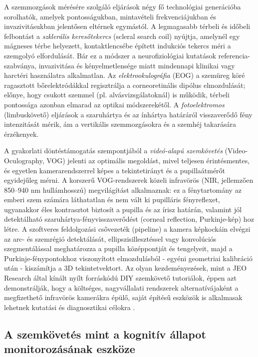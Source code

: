 \documentclass[12pt,a4paper,oneside]{book}
\begin{document}
A szemmozgások mérésére szolgáló eljárások négy fő technológiai generációba sorolhatók, amelyek pontosságukban, mintavételi frekvenciájukban és invazivitásukban jelentősen eltérnek egymástól. A legmagasabb térbeli és időbeli felbontást a \emph{szklerális keresőtekercs} (scleral search coil) nyújtja, amelynél egy mágneses térbe helyezett, kontaktlencsébe épített indukciós tekercs méri a szemgolyó elfordulását. Bár ez a módszer a neurofiziológiai kutatások referencia-szabványa, invazivitása és kényelmetlensége miatt mindennapi klinikai vagy harctéri használatra alkalmatlan. Az \emph{elektrookulográfia} (EOG) a szemüreg köré ragasztott bőrelektródákkal regisztrálja a corneoretinális dipólus elmozdulását; előnye, hogy csukott szemmel (pl. alvásvizsgálatoknál) is működik, térbeli pontossága azonban elmarad az optikai módszerekétől. A \emph{fotoelektromos} (limbuskövető) eljárások a szaruhártya és az ínhártya határáról visszaverődő fény intenzitását mérik, ám a vertikális szemmozgásokra és a szemhéj takarására érzékenyek.

A gyakorlati döntéstámogatás szempontjából a \emph{videó-alapú szemkövetés} (Video-Oculography, VOG) jelenti az optimális megoldást, mivel teljesen érintésmentes, és egyetlen kamerarendszerrel képes a tekintetirányt és a pupillaátmérőt egyidejűleg mérni. A korszerű VOG-rendszerek közeli infravörös (NIR, jellemzően 850--940 nm hullámhosszú) megvilágítást alkalmaznak: ez a fénytartomány az emberi szem számára láthatatlan és nem vált ki pupilláris fényreflexet, ugyanakkor éles kontrasztot biztosít a pupilla és az írisz határán, valamint jól detektálható szaruhártya-fényvisszaverődést (corneal reflection, Purkinje-kép) hoz létre. A szoftveres feldolgozási csővezeték (pipeline) a kamera képkockáin elvégzi az arc- és szemrégió detektálását, ellipszisillesztéssel vagy konvolúciós szegmentálással meghatározza a pupilla középpontját és tengelyeit, majd a Purkinje-fénypontokhoz viszonyított elmozdulásból - egyéni geometriai kalibráció után - kiszámítja a 3D tekintetvektort. Az olyan kezdeményezések, mint a JEO Research által kínált nyílt forráskódú DIY szemkövető tutoriálok, éppen azt demonstrálják, hogy a költséges, nagyvállalati rendszerek alternatívájaként a megfizethető infravörös kamerákra épülő, saját építésű eszközök is alkalmasak lehetnek kutatási és diagnosztikai célokra \cite{orlosky_jeo}.

\subsection{A szemkövetés mint a kognitív állapot monitorozásának eszköze}
\end{document}

